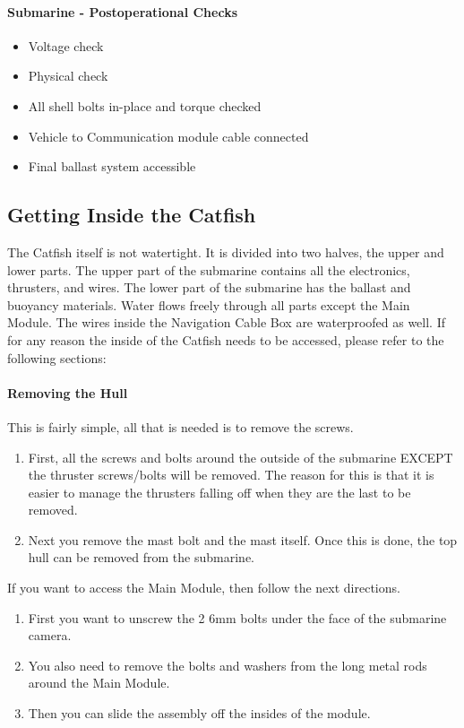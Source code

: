 \documentclass[
18pt, %
a4paper, %
oneside, %
headinclude,footinclude, %
]{scrartcl}
\begin{document}
\paragraph{Submarine - Postoperational Checks}

\begin{itemize}[noitemsep] %
	\item Voltage check
	\item Physical check
	\item All shell bolts in-place and torque checked
	\item Vehicle to Communication module cable connected
	\item Final ballast system accessible
\end{itemize}


\subsection{Getting Inside the Catfish}

The Catfish itself is not watertight. It is divided into two halves, the upper and lower parts. The upper part of the submarine contains all the electronics, thrusters, and wires. The lower part of the submarine has the ballast and buoyancy materials. Water flows freely through all parts except the Main Module. The wires inside the Navigation Cable Box are waterproofed as well. If for any reason the inside of the Catfish needs to be accessed, please refer to the following sections: 

\paragraph{Removing the Hull} This is fairly simple, all that is needed is to remove the screws. 

\begin{enumerate}
	\item First, all the screws and bolts around the outside of the submarine EXCEPT the thruster screws/bolts will be removed. The reason for this is that it is easier to manage the thrusters falling off when they are the last to be removed. 
	\item Next you remove the mast bolt and the mast itself. Once this is done, the top hull can be removed from the submarine. \\
\end{enumerate}
	If you want to access the Main Module, then follow the next directions. 
\begin{enumerate}
	\item First you want to unscrew the 2 6mm bolts under the face of the submarine camera. 
	\item You also need to remove the bolts and washers from the long metal rods around the Main Module. 
	\item Then you can slide the assembly off the insides of the module.
\end{enumerate}
\end{document}
